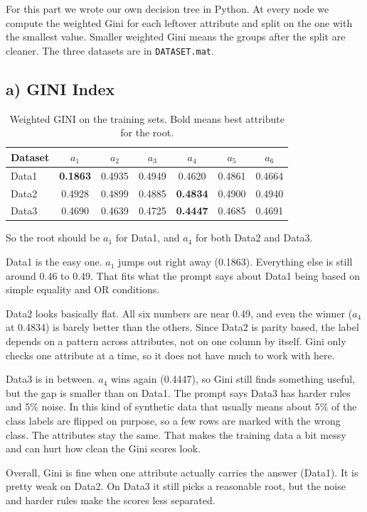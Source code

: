 \documentclass[11pt]{article}
\begin{document}
For this part we wrote our own decision tree in Python. At every node we compute the weighted Gini for each leftover attribute and split on the one with the smallest value. Smaller weighted Gini means the groups after the split are cleaner. The three datasets are in \texttt{DATASET.mat}.

\subsection*{a) GINI Index}

\begin{table}[h!]
\centering
\begin{tabular}{|l|c|c|c|c|c|c|}
\hline
\textbf{Dataset} & $a_1$ & $a_2$ & $a_3$ & $a_4$ & $a_5$ & $a_6$ \tabularnewline \hline
Data1 & \textbf{0.1863} & 0.4935 & 0.4949 & 0.4620 & 0.4861 & 0.4664 \tabularnewline \hline
Data2 & 0.4928 & 0.4899 & 0.4885 & \textbf{0.4834} & 0.4900 & 0.4940 \tabularnewline \hline
Data3 & 0.4690 & 0.4639 & 0.4725 & \textbf{0.4447} & 0.4685 & 0.4691 \tabularnewline \hline
\end{tabular}
\caption{Weighted GINI on the training sets. Bold means best attribute for the root.}
\end{table}

So the root should be $a_1$ for Data1, and $a_4$ for both Data2 and Data3.

Data1 is the easy one. $a_1$ jumps out right away (0.1863). Everything else is still around 0.46 to 0.49. That fits what the prompt says about Data1 being based on simple equality and OR conditions.

Data2 looks basically flat. All six numbers are near 0.49, and even the winner ($a_4$ at 0.4834) is barely better than the others. Since Data2 is parity based, the label depends on a pattern across attributes, not on one column by itself. Gini only checks one attribute at a time, so it does not have much to work with here.

Data3 is in between. $a_4$ wins again (0.4447), so Gini still finds something useful, but the gap is smaller than on Data1. The prompt says Data3 has harder rules and 5\% noise. In this kind of synthetic data that usually means about 5\% of the class labels are flipped on purpose, so a few rows are marked with the wrong class. The attributes stay the same. That makes the training data a bit messy and can hurt how clean the Gini scores look.

Overall, Gini is fine when one attribute actually carries the answer (Data1). It is pretty weak on Data2. On Data3 it still picks a reasonable root, but the noise and harder rules make the scores less separated.
\end{document}
